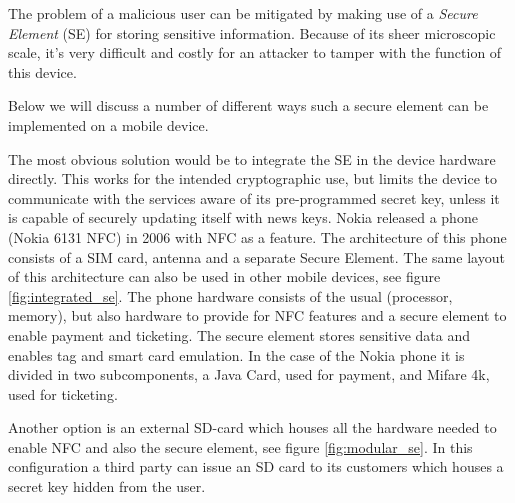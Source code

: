 


The problem of a malicious user can be mitigated by making use of a \textit{Secure Element} (SE) for storing sensitive information.
Because of its sheer microscopic scale, it's very difficult and costly for an attacker to tamper with the function of this device.

Below we will discuss a number of different ways such a secure element can be implemented on a mobile device. 

The most obvious solution would be to integrate the SE in the device hardware directly.
This works for the intended cryptographic use, but limits the device to communicate with the services aware of its pre-programmed secret key, unless it is capable of securely updating itself with news keys.
Nokia released a phone (Nokia 6131 NFC) in 2006 with NFC as a feature.
The architecture of this phone consists of a SIM card, antenna and a separate Secure Element.
The same layout of this architecture can also be used in other mobile devices, see figure \ref{fig:integrated_se}.
The phone hardware consists of the usual (processor, memory), but also hardware to provide for NFC features and a secure element to enable payment and ticketing.
The secure element stores sensitive data and enables tag and smart card emulation.
In the case of the Nokia phone it is divided in two subcomponents, a Java Card, used for payment, and Mifare 4k, used for ticketing.


Another option is an external SD-card which houses all the hardware needed to enable NFC and also the secure element, see figure \ref{fig:modular_se}.
In this configuration a third party can issue an SD card to its customers which houses a secret key hidden from the user.

